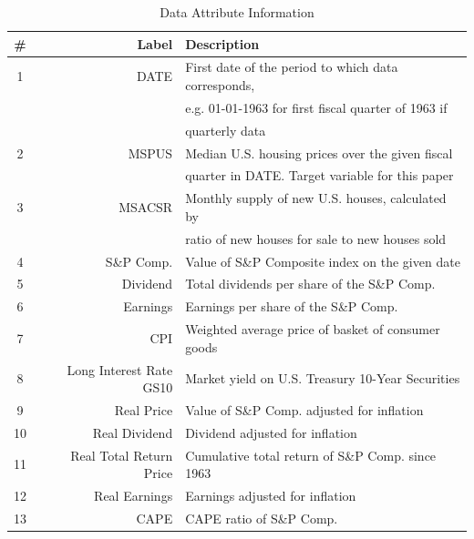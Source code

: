 \documentclass [MS] {uclathes}
\begin{document}
\begin{table}[H]
\centering
\renewcommand{\arraystretch}{0.75}
\caption{Data Attribute Information}
\label{tab:Attribute_Info}
\begin{tabular}{c|r|l} \hline
\textbf{\#}   & \textbf{Label}             & \textbf{Description}                               \\ 
\hline \hline
1  &            DATE                       & First date of the period to which data corresponds, \\
   &                                       & e.g. 01-01-1963 for first fiscal quarter of 1963 if      \\
   &                                       & quarterly data                                   \\
2  &            MSPUS                      & Median U.S. housing prices over the given fiscal \\
   &                                       & quarter in DATE. Target variable for this paper  \\
3  &            MSACSR                     & Monthly supply of new U.S. houses, calculated by \\           
   &                                       & ratio of new houses for sale to new houses sold   \\
4  &            S\&P Comp.                 & Value of S\&P Composite index on the given date \\
5  &            Dividend                   & Total dividends per share of the S\&P Comp. \\
6  &            Earnings                   & Earnings per share of the S\&P Comp. \\
7  &            CPI                        & Weighted average price of basket of consumer goods\\
8  &            Long Interest Rate GS10    & Market yield on U.S. Treasury 10-Year Securities \\
9  &            Real Price                 & Value of S\&P Comp. adjusted for inflation \\
10 &            Real Dividend              & Dividend adjusted for inflation \\
11 &            Real Total Return Price    & Cumulative total return of S\&P Comp. since 1963 \\
12 &            Real Earnings              & Earnings adjusted for inflation \\
13 &            CAPE                       & CAPE ratio of S\&P Comp. \\

\end{tabular}
\end{table}
\end{document}
